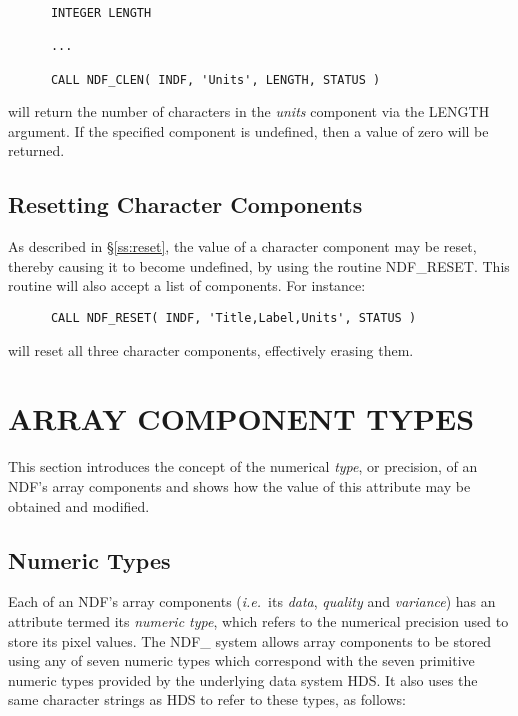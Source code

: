 \documentclass[twoside,11pt]{article}
\newcommand{\htmlref}[2]{#1}
\newcommand{\xref}[3]{#1}
\newcommand{\xlabel}[1]{}
\newcommand{\st}[1]{{\em{#1}}}
\begin{document}
\small
\begin{verbatim}
      INTEGER LENGTH

      ...

      CALL NDF_CLEN( INDF, 'Units', LENGTH, STATUS )
\end{verbatim}
\normalsize

will return the number of characters in the \st{units\/} component via the
LENGTH argument. 
If the specified component is undefined, then a value of zero will be 
returned.

\subsection{\xlabel{resetting_character_components}Resetting Character Components}

As described in \S\ref{ss:reset}, the value of a character component may be
reset, thereby causing it to become undefined, by using the routine \htmlref{NDF\_RESET}{NDF_RESET}.
This routine will also accept a list of components.
For instance:

\small
\begin{verbatim}
      CALL NDF_RESET( INDF, 'Title,Label,Units', STATUS )
\end{verbatim}
\normalsize

will reset all three character components, effectively erasing them.


\section{\xlabel{array_component_types}ARRAY COMPONENT TYPES}

This section introduces the concept of the numerical \st{type}, or
precision, of an NDF's array components and shows how the value of
this attribute may be obtained and modified.

\subsection{\xlabel{numeric_types}\label{ss:numerictypes}Numeric Types}

Each of an NDF's array components (\st{i.e.}\ its \st{data},
\st{quality\/} and \st{variance\/}) has an attribute termed its \st{numeric 
type}, which refers to the numerical precision used to store its pixel
values. 
The NDF\_ system allows array components to be stored using any of seven
numeric types which correspond with the seven primitive numeric types
provided by the underlying data system \xref{HDS}{sun92}{}. 
It also uses the same character strings as HDS to refer to these
types, as follows:
\end{document}
